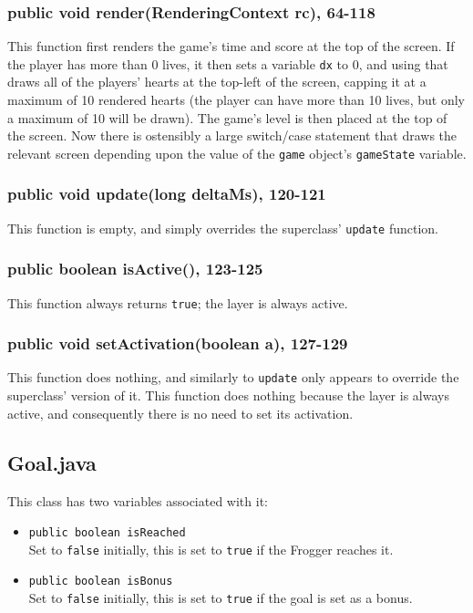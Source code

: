 \documentclass[12pt]{article}
\begin{document}
\subsubsection{public void render(RenderingContext rc), 64-118}
This function first renders the game's time and score at the top of the screen.
If the player has more than 0 lives, it then sets a variable \verb|dx| to 0, and using that draws all of the players' hearts at the top-left of the screen, capping it at a maximum of 10 rendered hearts (the player can have more than 10 lives, but only a maximum of 10 will be drawn).
The game's level is then placed at the top of the screen.
Now there is ostensibly a large switch/case statement that draws the relevant screen depending upon the value of the \verb|game| object's \verb|gameState| variable.

\subsubsection{public void update(long deltaMs), 120-121}
This function is empty, and simply overrides the superclass' \verb|update| function.

\subsubsection{public boolean isActive(), 123-125}
This function always returns \verb|true|; the layer is always active.

\subsubsection{public void setActivation(boolean a), 127-129}
This function does nothing, and similarly to \verb|update| only appears to override the superclass' version of it.
This function does nothing because the layer is always active, and consequently there is no need to set its activation.

\subsection{Goal.java}
This class has two variables associated with it:
\begin{itemize}
  \item \verb|public boolean isReached|\\
        Set to \verb|false| initially, this is set to \verb|true| if the Frogger reaches it.
  \item \verb|public boolean isBonus|\\
        Set to \verb|false| initially, this is set to \verb|true| if the goal is set as a bonus.
\end{itemize}
\end{document}
